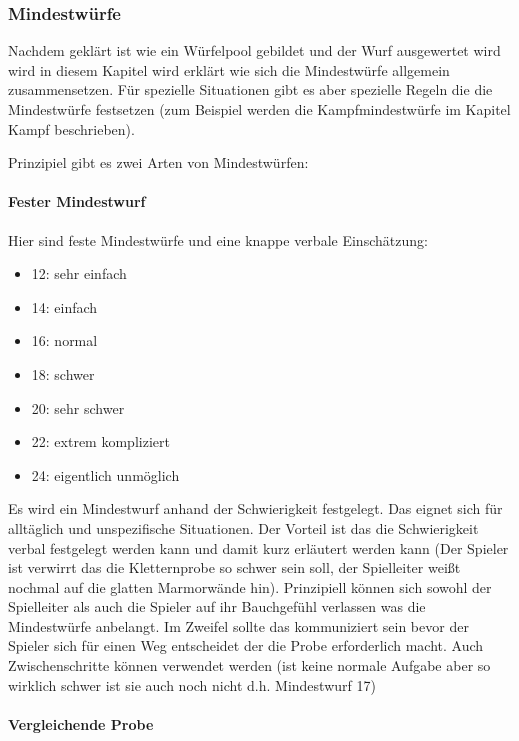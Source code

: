 \documentclass{article}
\begin{document}
\subsubsection{Mindestwürfe}

Nachdem geklärt ist wie ein Würfelpool gebildet und der Wurf ausgewertet wird wird in diesem Kapitel wird erklärt wie
sich die Mindestwürfe allgemein zusammensetzen. Für spezielle Situationen gibt es aber spezielle Regeln die die
Mindestwürfe festsetzen (zum Beispiel werden die Kampfmindestwürfe im Kapitel Kampf beschrieben).

Prinzipiel gibt es zwei Arten von Mindestwürfen:

\paragraph{Fester Mindestwurf}

Hier sind feste Mindestwürfe und eine knappe verbale Einschätzung:

\begin{itemize}
\item 12: sehr einfach
\item 14: einfach
\item 16: normal
\item 18: schwer
\item 20: sehr schwer
\item 22: extrem kompliziert
\item 24: eigentlich unmöglich
\end{itemize}

Es wird ein Mindestwurf anhand der Schwierigkeit festgelegt. Das eignet sich für alltäglich und unspezifische
Situationen. Der Vorteil ist das die Schwierigkeit verbal festgelegt werden kann und damit kurz erläutert werden
kann (Der Spieler ist verwirrt das die Kletternprobe so schwer sein soll, der Spielleiter weißt nochmal auf die
glatten Marmorwände hin). Prinzipiell können sich sowohl der Spielleiter als auch die Spieler auf ihr Bauchgefühl
verlassen was die Mindestwürfe anbelangt. Im Zweifel sollte das kommuniziert sein bevor der Spieler sich für einen
Weg entscheidet der die Probe erforderlich macht. Auch Zwischenschritte können verwendet werden (ist keine normale
Aufgabe aber so wirklich schwer ist sie auch noch nicht d.h. Mindestwurf 17)

\paragraph{Vergleichende Probe}
\end{document}
